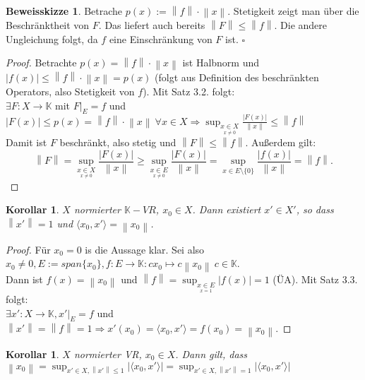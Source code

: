 \documentclass[ngerman]{report}
\theoremstyle{plain}%
\newtheorem{cor}[thm]{Korollar}
\theoremstyle{definition}%
\theoremstyle{myStyle}
\newtheorem*{proof*}{Beweisskizze}
\newenvironment{hinweise}{\footnotesize \begin{proof*}}{\hfill $\square$ \end{proof*}\normalsize}
\newcommand{\K}{\mathbb{K}}
\newcommand{\norm}[1]{\left \|#1\right\| }
\newcommand{\df}[1][]{%
	\overset{#1}{\Rightarrow}
}
\newcommand{\disp}{\displaystyle}
\newcommand{\f}[2]{\langle #1,#2 \rangle} %
\begin{document}
	\begin{hinweise}
		Betrache $p(x) := \norm{f}\cdot \norm{x}$. Stetigkeit zeigt man über die Beschränktheit von $F$. Das liefert auch bereits $\norm{F} \leq \norm{f}$. Die andere Ungleichung folgt, da $f$ eine Einschränkung von $F$ ist. 
	\end{hinweise}
	
	\begin{proof}
		Betrachte $p(x)=\norm{f} \cdot \norm{x}$ ist Halbnorm und 
		$|f(x)|\leq \norm{f} \cdot \norm{x} = p(x)$ 
		(folgt aus Definition des beschränkten Operators, also Stetigkeit von $f$). Mit Satz 3.2. folgt:\\
		$\exists F: X \to \K$ mit $F|_E=f$ und $|F(x)| \leq p(x) = \norm{f} \cdot \norm{x} ~\forall x \in X \df \disp \sup_{\underset{x \neq 0}{x\in X}} \frac{|F(x)|}{\norm{x}} \leq \norm{f} $\\
		Damit ist $F$ beschränkt, also stetig und $\norm{F} \leq \norm{f}$. 
		Außerdem gilt:
		\[ \norm{F}=\sup_{\underset{x \neq 0}{x\in X}} \frac{|F(x)|}{\norm{x}} \geq \sup_{\underset{x \neq 0}{x\in E}} \frac{|F(x)|}{\norm{x}}=\sup_{x\in E\setminus\{0\}} \frac{|f(x)|}{\norm{x}}=\norm{f}.  \]
\end{proof}

	\begin{cor}
		$X$ normierter $\K-VR$, $x_0 \in X$. Dann existiert $x' \in X'$, so dass $\norm{x'} =1$ und $\langle x_0, x' \rangle = \norm{x_0}$.
	\end{cor}

	\begin{proof}
		Für $x_0=0$ is die Aussage klar. Sei also $x_0 \neq 0, E:=span\{x_0\}, f:E \to \K: cx_0 \mapsto c\norm{x_0} ~c\in\K$.\\
		Dann ist $f(x)=\norm{x_0}$ und $ \norm{f} = \disp \sup_{\underset{x = 1}{x\in E}} |f(x)|=1$ (ÜA). Mit Satz 3.3. folgt:\\
		$\exists x':X\to\K, x'|_E=f$ und $\norm{x'}=\norm{f}=1 \df x'(x_0)=\f{x_0}{x'}=f(x_0)=\norm{x_0}.$
	\end{proof}


	\begin{cor}
		$X$ normierter VR, $x_0 \in X$. Dann gilt, dass $\norm{x_0} = \sup_{x' \in X, \norm{x'} \leq 1}|\langle x_0, x' \rangle | = \sup_{x' \in X, \norm{x'} = 1}|\langle x_0, x' \rangle |$
	\end{cor}		
\end{document}
